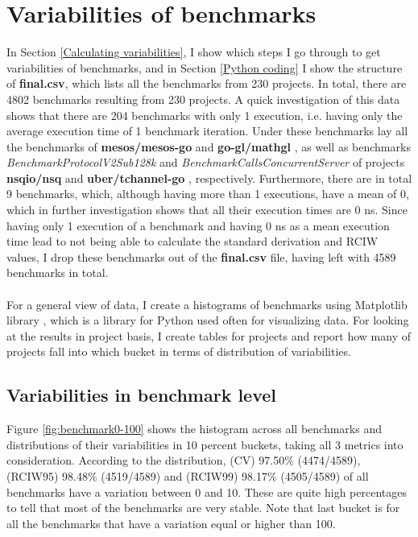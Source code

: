 \documentclass{seal_thesis}
\begin{document}
\section{Variabilities of benchmarks}
\label{Variabilities of benchmarks}

In Section \ref{Calculating variabilities}, I show which steps I go through to get variabilities of benchmarks, and in Section \ref{Python coding} I show the structure of \textbf{final.csv}, which lists all the benchmarks from 230 projects. In total, there are 4802 benchmarks resulting from 230 projects. A quick investigation of this data shows that there are 204 benchmarks with only 1 execution, i.e. having only the average execution time of 1 benchmark iteration. Under these benchmarks lay all the benchmarks of \textbf{mesos/mesos-go} \cite{mesos/mesos-go} and \textbf{go-gl/mathgl} \cite{go-gl/mathgl}, as well as benchmarks \textit{BenchmarkProtocolV2Sub128k} and \textit{BenchmarkCallsConcurrentServer} of projects \textbf{nsqio/nsq} \cite{nsqio/nsq} and \textbf{uber/tchannel-go} \cite{uber/tchannel-go}, respectively. Furthermore, there are in total 9 benchmarks, which, although having more than 1 executions, have a mean of 0, which in further investigation shows that all their execution times are 0 ns. Since having only 1 execution of a benchmark and having 0 ns as a mean execution time lead to not being able to calculate the standard derivation and RCIW values, I drop these benchmarks out of the \textbf{final.csv} file, having left with 4589 benchmarks in total.\\
\\
For a general view of data, I create a histograms of benchmarks using Matplotlib library \cite{Matplotlib}, which is a library for Python used often for visualizing data. For looking at the results in project basis, I create tables for projects and report how many of projects fall into which bucket in terms of distribution of variabilities.

\subsection{Variabilities in benchmark level}

Figure \ref{fig:benchmark0-100} shows the histogram across all benchmarks and distributions of their variabilities in 10 percent buckets, taking all 3 metrics into consideration. According to the distribution, (CV) 97.50\% (4474/4589), (RCIW95) 98.48\% (4519/4589) and (RCIW99) 98.17\% (4505/4589) of all benchmarks have a variation between 0 and 10. These are quite high percentages to tell that most of the benchmarks are very stable. Note that last bucket is for all the benchmarks that have a variation equal or higher than 100.
\end{document}
